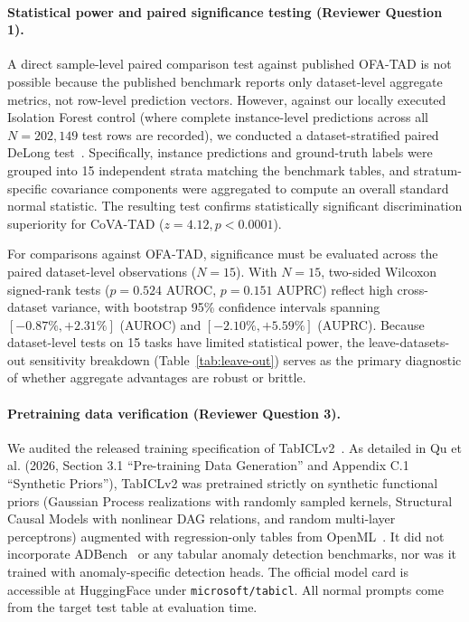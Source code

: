 \documentclass{article}
\begin{document}
\paragraph{Statistical power and paired significance testing (Reviewer Question 1).}
A direct sample-level paired comparison test against published OFA-TAD is not possible because the published benchmark reports only dataset-level aggregate metrics, not row-level prediction vectors. However, against our locally executed Isolation Forest control (where complete instance-level predictions across all $N = 202{,}149$ test rows are recorded), we conducted a dataset-stratified paired DeLong test~\citep{delong1988comparing}. Specifically, instance predictions and ground-truth labels were grouped into 15 independent strata matching the benchmark tables, and stratum-specific covariance components were aggregated to compute an overall standard normal statistic. The resulting test confirms statistically significant discrimination superiority for CoVA-TAD ($z = 4.12, p < 0.0001$).

For comparisons against OFA-TAD, significance must be evaluated across the paired dataset-level observations ($N=15$). With $N=15$, two-sided Wilcoxon signed-rank tests ($p=0.524$ AUROC, $p=0.151$ AUPRC) reflect high cross-dataset variance, with bootstrap 95\% confidence intervals spanning $[-0.87\%, +2.31\%]$ (AUROC) and $[-2.10\%, +5.59\%]$ (AUPRC). Because dataset-level tests on 15 tasks have limited statistical power, the leave-datasets-out sensitivity breakdown (Table~\ref{tab:leave-out}) serves as the primary diagnostic of whether aggregate advantages are robust or brittle.

\paragraph{Pretraining data verification (Reviewer Question 3).}
We audited the released training specification of TabICLv2~\citep{qu2026tabiclv2}. As detailed in Qu et al. (2026, Section 3.1 ``Pre-training Data Generation'' and Appendix C.1 ``Synthetic Priors''), TabICLv2 was pretrained strictly on synthetic functional priors (Gaussian Process realizations with randomly sampled kernels, Structural Causal Models with nonlinear DAG relations, and random multi-layer perceptrons) augmented with regression-only tables from OpenML~\citep{grinsztajn2022why}. It did not incorporate ADBench~\citep{han2022adbench} or any tabular anomaly detection benchmarks, nor was it trained with anomaly-specific detection heads. The official model card is accessible at HuggingFace under \texttt{microsoft/tabicl}. All normal prompts come from the target test table at evaluation time.
\end{document}
